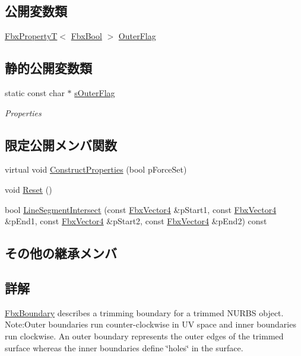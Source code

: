 \subsection*{公開変数類}
\begin{DoxyCompactItemize}
\item 
\hyperlink{class_fbx_property_t}{Fbx\+PropertyT}$<$ \hyperlink{fbxtypes_8h_a92e0562b2fe33e76a242f498b362262e}{Fbx\+Bool} $>$ \hyperlink{class_fbx_boundary_af9e27e491f466ca615bd247fa2b33826}{Outer\+Flag}
\end{DoxyCompactItemize}
\subsection*{静的公開変数類}
\begin{DoxyCompactItemize}
\item 
static const char $\ast$ \hyperlink{class_fbx_boundary_a2a42aaddc584761f409ced017e6ddd35}{s\+Outer\+Flag}
\begin{DoxyCompactList}\small\item\em Properties \end{DoxyCompactList}\end{DoxyCompactItemize}
\subsection*{限定公開メンバ関数}
\begin{DoxyCompactItemize}
\item 
virtual void \hyperlink{class_fbx_boundary_acb50e021b1e9920026c975613a949537}{Construct\+Properties} (bool p\+Force\+Set)
\item 
void \hyperlink{class_fbx_boundary_a989aba9b8873dc0c8264879b75f86dee}{Reset} ()
\item 
bool \hyperlink{class_fbx_boundary_afdc24b2ebd724263f2a20a8159006e42}{Line\+Segment\+Intersect} (const \hyperlink{class_fbx_vector4}{Fbx\+Vector4} \&p\+Start1, const \hyperlink{class_fbx_vector4}{Fbx\+Vector4} \&p\+End1, const \hyperlink{class_fbx_vector4}{Fbx\+Vector4} \&p\+Start2, const \hyperlink{class_fbx_vector4}{Fbx\+Vector4} \&p\+End2) const
\end{DoxyCompactItemize}
\subsection*{その他の継承メンバ}


\subsection{詳解}
\hyperlink{class_fbx_boundary}{Fbx\+Boundary} describes a trimming boundary for a trimmed N\+U\+R\+BS object. Note\+:Outer boundaries run counter-\/clockwise in UV space and inner boundaries run clockwise. An outer boundary represents the outer edges of the trimmed surface whereas the inner boundaries define \char`\"{}holes\char`\"{} in the surface. 


